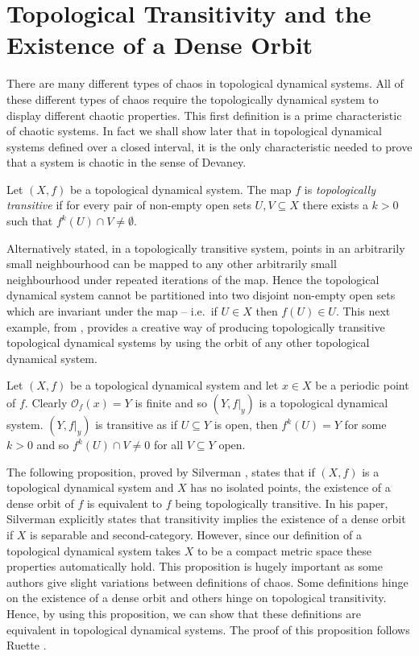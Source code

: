 \section{Topological Transitivity and the Existence of a Dense Orbit} \label{sec:topological-transitivity}

There are many different types of chaos in topological dynamical systems. All of these different types of chaos require the topologically dynamical system to display different chaotic properties.
This first definition is a prime characteristic of chaotic systems. In fact we shall show later that in topological dynamical systems defined over a closed interval, it is the only characteristic needed to prove that a system is chaotic in the sense of Devaney.

\begin{defn} \label{defn:topological-transitivity}
    Let $(X, f)$ be a topological dynamical system. The map $f$ is \emph{topologically transitive} if for every pair of non-empty open sets $U, V \subseteq X$ there exists a $k > 0$ such that $f^k(U) \cap V \neq \emptyset$.
\end{defn}

Alternatively stated, in a topologically transitive system, points in an arbitrarily small neighbourhood can be mapped to any other arbitrarily small neighbourhood under repeated iterations of the map. Hence the topological dynamical system cannot be partitioned into two disjoint non-empty open sets which are invariant under the map -- i.e.\ if $U \in X$ then $f(U) \in U$. This next example, from \cite{kolyada-snoha}, provides a creative way of producing topologically transitive topological dynamical systems by using the orbit of any other topological dynamical system.

\begin{exmp}
    Let $(X, f)$ be a topological dynamical system and let $x \in X$ be a periodic point of $f$. Clearly $\mathcal{O}_f(x) = Y$ is finite and so $(Y, f|_y)$ is a topological dynamical system. $(Y, f|_y)$ is transitive as if $U \subseteq Y$ is open, then $f^k(U) = Y$ for some $k > 0$ and so $f^k(U) \cap V \neq 0$ for all $V \subseteq Y$ open.
\end{exmp}

The following proposition, proved by Silverman \cite{silverman}, states that if $(X, f)$ is a topological dynamical system and $X$ has no isolated points, the existence of a dense orbit of $f$ is equivalent to $f$ being topologically transitive. In his paper, Silverman explicitly states that transitivity implies the existence of a dense orbit if $X$ is separable and second-category. However, since our definition of a topological dynamical system takes $X$ to be a compact metric space these properties automatically hold. This proposition is hugely important as some authors give slight variations between definitions of chaos. Some definitions hinge on the existence of a dense orbit and others hinge on topological transitivity. Hence, by using this proposition, we can show that these definitions are equivalent in topological dynamical systems. The proof of this proposition follows Ruette \cite[\S 2.1]{ruette}.

